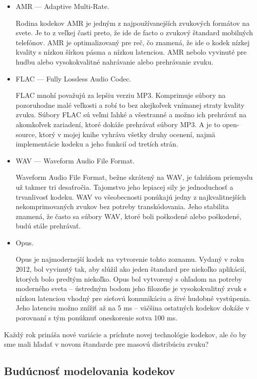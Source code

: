 \documentclass[10pt,twoside,slovak,a4paper]{article}
\begin{document}
\begin{itemize}
\item AMR — Adaptive Multi-Rate.

Rodina kodekov AMR je jedným z najpoužívanejších zvukových formátov na svete. Je to z veľkej časti preto, že ide de facto o zvukový štandard mobilných telefónov. AMR je optimalizovaný pre reč, čo znamená, že ide o kodek nízkej kvality s nízkou šírkou pásma a nízkou latenciou. AMR nebolo vyvinuté pre hudbu alebo vysokokvalitné nahrávanie alebo prehrávanie zvuku. 

\item FLAC — Fully Lossless Audio Codec.

FLAC mnohí považujú za lepšiu verziu MP3. Komprimuje súbory na pozoruhodne malé veľkosti a robí to bez akejkoľvek vnímanej straty kvality zvuku. Súbory FLAC sú veľmi ľahké a všestranné a možno ich prehrávať na akomkoľvek zariadení, ktoré dokáže prehrávať súbory MP3. A je to open-source, ktorý v mojej knihe vyhráva všetky druhy ocenení, najmä implementácie kodeku a jeho funkcií od tretích strán. 

\item WAV — Waveform Audio File Format.

Waveform Audio File Format, bežne skrátený na WAV, je ťahúňom priemyslu už takmer tri desaťročia. Tajomstvo jeho lepiacej sily je jednoduchosť a trvanlivosť kodeku. WAV vo všeobecnosti ponúkajú jedny z najkvalitnejších nekomprimovaných zvukov bez potreby transkódovania. Jeho stabilita znamená, že často sa súbory WAV, ktoré boli poškodené alebo poškodené, budú stále prehrávať.

\item Opus.

Opus je najmodernejší kodek na vytvorenie tohto zoznamu. Vydaný v roku 2012, bol vyvinutý tak, aby slúžil ako jeden štandard pre niekoľko aplikácií, ktorých bolo predtým niekoľko. Opus bol vytvorený s ohľadom na potreby moderného sveta – ústredným bodom jeho filozofie je vysokokvalitný zvuk s nízkou latenciou vhodný pre sieťovú komunikáciu a živé hudobné vystúpenia. Jeho latenciu možno znížiť až na 5 ms – väčšina ostatných kodekov dokáže v porovnaní s tým ponúknuť oneskorenie sotva 100 ms. 
\end{itemize}

Každý rok prináša nové variácie a príchute novej technológie kodekov, ale čo by sme mali hľadať v novom štandarde pre masovú distribúciu zvuku?

\subsection{Budúcnosť modelovania kodekov} \label{buducnosť}
\end{document}
